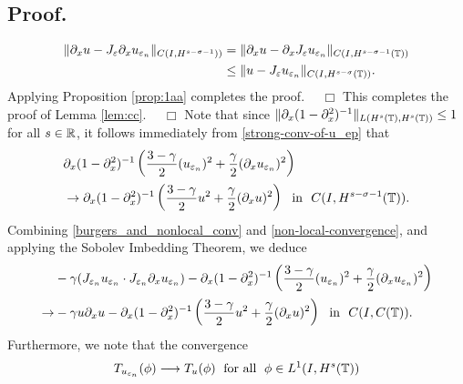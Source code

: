 			\subsection{ Proof.} 
			\begin{equation*}
				\begin{split}
					\|\partial_x u - J_\varepsilon \partial_x u_{\varepsilon_n} \|_{C(I,
					H^{s-\sigma-1}))}  
					& = \|\partial_x u - \partial_x J_\varepsilon u_{\varepsilon_n} \|_{C(I,
					H^{s-\sigma-1}(\mathbb{T}))} 
					\\
					& \le \|u - J_\varepsilon u_{\varepsilon_n} \|_{C(I,
					H^{s-\sigma}(\mathbb{T}))}.
				\end{split}
			\end{equation*}
			Applying Proposition \ref{prop:1aa} completes the proof. $\quad
			\Box$
			This completes the proof of Lemma \ref{lem:cc}. $\quad \Box$
		Note that since $\|\partial_x (1-\partial_x^2)^{-1}\|_{L(H^s(\mathbb{T}), H^s(\mathbb{T}))}
		\le 1$ for all $s \in \mathbb{R}$, it follows immediately from
		\eqref{strong-conv-of-u_ep} that
		\begin{equation}
			\begin{split}
				& \partial_x(1- \partial_x^2)^{-1} \left( \frac{3-\gamma}{2}
				(u_{\varepsilon_n})^2
				 + \frac{\gamma}{2} (\partial_x u_{\varepsilon_n})^2 \right )
				 \\
				 & \to
				 \partial_x(1- \partial_x^2)^{-1} \left( \frac{3-\gamma}{2} u^2
				 + \frac{\gamma}{2} (\partial_x u)^2 \right ) \ \
				 \text{in} \ \ C(I, H^{s-\sigma-1}(\mathbb{T})).
				\label{non-local-convergence}
			\end{split}
		\end{equation}
		Combining \eqref{burgers_and_nonlocal_conv} and
		\eqref{non-local-convergence}, and applying the Sobolev Imbedding
		Theorem, we deduce 
		\begin{equation}
			\begin{split}
				& -\gamma (J_{\varepsilon_n} u_{\varepsilon_n} \cdot J_{\varepsilon_n} \partial_x
				u_{\varepsilon_n}) - \partial_x(1- \partial_x^2)^{-1} \left( \frac{3-\gamma}{2}
				(u_{\varepsilon_n})^2
				 + \frac{\gamma}{2} (\partial_x u_{\varepsilon_n})^2 \right )
				 \\
				 \to & -\gamma u \partial_x u -
				 \partial_x(1- \partial_x^2)^{-1} \left( \frac{3-\gamma}{2} u^2
				 + \frac{\gamma}{2} (\partial_x u)^2 \right ) \ \
				 \text{in} \ \ C(I, C(\mathbb{T})).
				\label{loc-non-loc-tog}
			\end{split}
		\end{equation}
		Furthermore, we note that the convergence  
		\begin{equation}
			\label{weak-conv-2}
			T_{u_{\varepsilon_n}}(\phi)  \longrightarrow  T_u(\phi) \;
			\text{ for all } \;  \phi \in L^1(I, H^{s}(\mathbb{T}))
		\end{equation}
